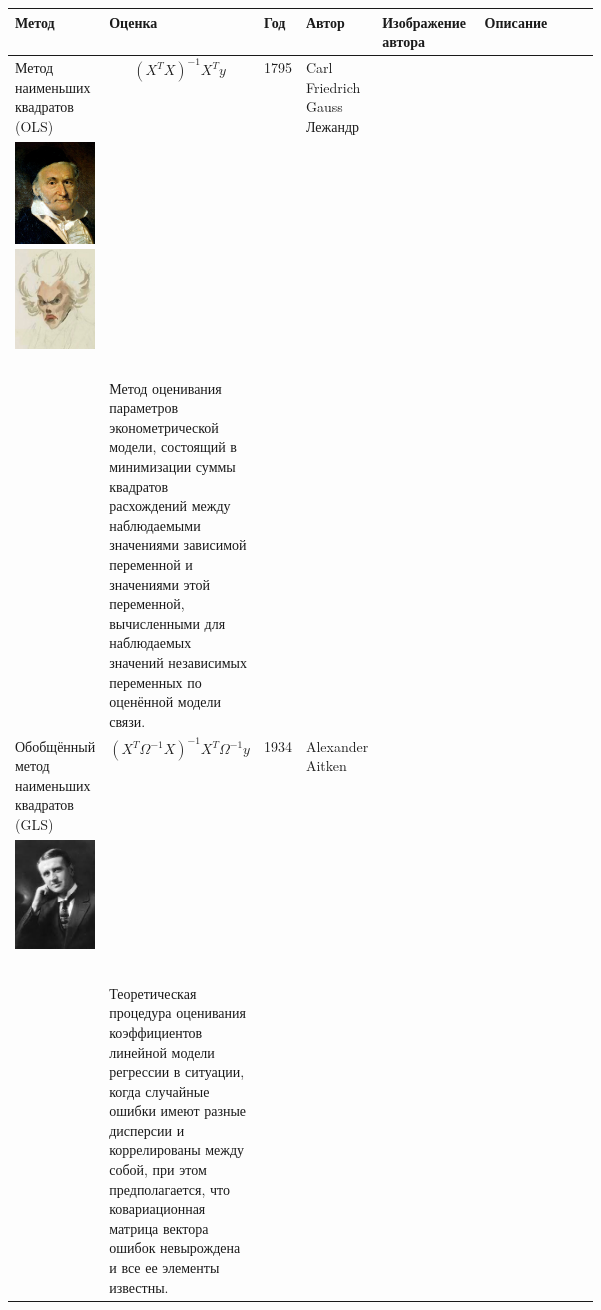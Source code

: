 \documentclass[10pt,a4paper]{article}
\begin{document}
\begin{table}

\begin{tabular}{|m{0.066\linewidth}|m{.11\linewidth}|m{.065\linewidth}|m{.05\linewidth}|m{0.205\linewidth}|m{0.412\linewidth}|}
\hline
Метод & Оценка & Год & Автор & Изображение автора & Описание\\
\hline
Метод наименьших квадратов (OLS) &   $$ (X^{T}X)^{-1}X^Ty $$ & 1795 & Carl Friedrich Gauss  Лежандр & \begin{minipage}[t]{\linewidth} \ \\\includegraphics[width=0.25\linewidth]{gauss.jpg} \hfill \includegraphics[width=0.258\linewidth]{lezhandr.jpg} \ \\\end{minipage} & Метод оценивания параметров эконометрической модели, состоящий в минимизации суммы квадратов расхождений между наблюдаемыми значениями зависимой переменной и значениями этой переменной, вычисленными для наблюдаемых значений независимых переменных по оценённой модели связи. \\
\hline
Обобщённый метод наименьших квадратов (GLS) &  
$$(X^T \Omega^{-1} X)^{-1}X^T \Omega^{-1} y$$
& 1934 & Alexander Aitken & \begin{minipage}[t]{\linewidth} \centering \ \\ \includegraphics[width=0.25\linewidth]{alexander_craig_aitken_1_large.jpg} \\ \ \\\end{minipage} & Теоретическая процедура оценивания коэффициентов линейной модели регрессии в ситуации, когда случайные ошибки имеют разные дисперсии и коррелированы между собой, при этом предполагается,  что ковариационная матрица вектора ошибок невырождена и все ее элементы известны. \\

\end{tabular}
\end{table}
\end{document}
